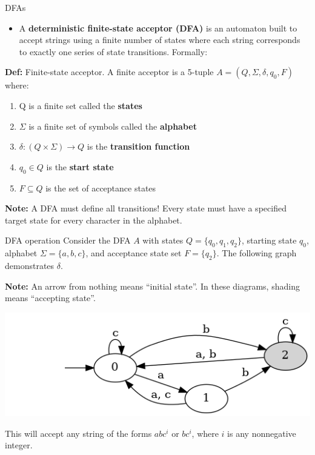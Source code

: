 \begin{frame}{DFAs}
\protect\hypertarget{dfas}{}
\begin{itemize}
\tightlist
\item
  A \textbf{deterministic finite-state acceptor (DFA)} is an automaton
  built to accept strings using a finite number of states where each
  string corresponds to exactly one series of state transitions.
  Formally:
\end{itemize}

\textbf{Def:} Finite-state acceptor. A finite acceptor is a 5-tuple
\(A = (Q, \Sigma, \delta, q_0, F)\) where:

\begin{enumerate}
[1)]
\tightlist
\item
  Q is a finite set called the \textbf{states}
\item
  \(\Sigma\) is a finite set of symbols called the \textbf{alphabet}
\item
  \(\delta : ( Q \times \Sigma ) \to Q\) is the \textbf{transition
  function}
\item
  \(q_0 \in Q\) is the \textbf{start state}
\item
  \(F \subseteq Q\) is the set of acceptance states
\end{enumerate}

\textbf{Note:} A DFA must define all transitions! Every state must have
a specified target state for every character in the alphabet.
\end{frame}

\begin{frame}{DFA operation}
\protect\hypertarget{dfa-operation}{}
Consider the DFA \(A\) with states \(Q = \{ q_0, q_1, q_2 \}\), starting
state \(q_0\), alphabet \(\Sigma = \{ a, b, c \}\), and acceptance state
set \(F = \{ q_2 \}\). The following graph demonstrates \(\delta\).

\textbf{Note:} An arrow from nothing means ``initial state''. In these
diagrams, shading means ``accepting state''.

\includegraphics{figures/dfa_ex.png}

This will accept any string of the forms \(abc^i\) or \(bc^i\), where
\(i\) is any nonnegative integer.
\end{frame}

